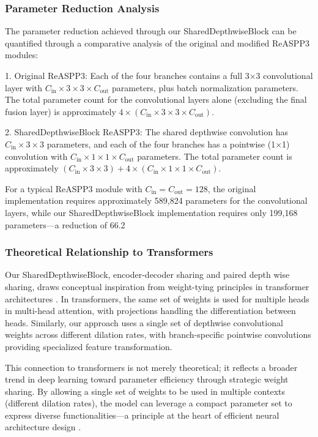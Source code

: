 \documentclass[12pt,a4paper]{article}
\begin{document}
\begin{enumerate}
\subsubsection{Parameter Reduction Analysis}

The parameter reduction achieved through our SharedDepthwiseBlock can be quantified through a comparative analysis of the original and modified ReASPP3 modules:

1. Original ReASPP3: Each of the four branches contains a full 3×3 convolutional layer with $C_{\textrm{in}} \times 3 \times 3 \times C_{\textrm{out}}$ parameters, plus batch normalization parameters. The total parameter count for the convolutional layers alone (excluding the final fusion layer) is approximately $4 \times (C_{\textrm{in}} \times 3 \times 3 \times C_{\textrm{out}})$.

2. SharedDepthwiseBlock ReASPP3: The shared depthwise convolution has $C_{\textrm{in}} \times 3 \times 3$ parameters, and each of the four branches has a pointwise (1×1) convolution with $C_{\textrm{in}} \times 1 \times 1 \times C_{\textrm{out}}$ parameters. The total parameter count is approximately $(C_{\textrm{in}} \times 3 \times 3) + 4 \times (C_{\textrm{in}} \times 1 \times 1 \times C_{\textrm{out}})$.

For a typical ReASPP3 module with $C_{\textrm{in}} = C_{\textrm{out}} = 128$, the original implementation requires approximately 589,824 parameters for the convolutional layers, while our SharedDepthwiseBlock implementation requires only 199,168 parameters—a reduction of 66.2%

\subsubsection{Theoretical Relationship to Transformers}

Our SharedDepthwiseBlock, encoder-decoder sharing and paired depth wise sharing, draws conceptual inspiration from weight-tying principles in transformer architectures \cite{Jeong2021, Vaswani2017Attention}. In transformers, the same set of weights is used for multiple heads in multi-head attention, with projections handling the differentiation between heads. Similarly, our approach uses a single set of depthwise convolutional weights across different dilation rates, with branch-specific pointwise convolutions providing specialized feature transformation.

This connection to transformers is not merely theoretical; it reflects a broader trend in deep learning toward parameter efficiency through strategic weight sharing. By allowing a single set of weights to be used in multiple contexts (different dilation rates), the model can leverage a compact parameter set to express diverse functionalities—a principle at the heart of efficient neural architecture design \cite{Howard2019Searching, Jeong2021}.


\end{enumerate}
\end{document}
